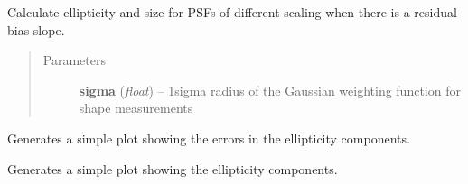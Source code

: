 \documentclass[a4paper,12pt,english]{sphinxmanual}
\begin{document}

\begin{fulllineitems}
\label{reduction:analysis.biasCalibration.findTolerableErrorSlope}
Calculate ellipticity and size for PSFs of different scaling when there is a residual
bias slope.
\begin{quote}\begin{description}
\item[{Parameters}] \leavevmode
\textbf{sigma} (\emph{float}) -- 1sigma radius of the Gaussian weighting function for shape measurements

\end{description}\end{quote}

\end{fulllineitems}


\begin{fulllineitems}
\label{reduction:analysis.biasCalibration.plotDeltaEs}
Generates a simple plot showing the errors in the ellipticity components.

\end{fulllineitems}


\begin{fulllineitems}
\label{reduction:analysis.biasCalibration.plotEs}
Generates a simple plot showing the ellipticity components.

\end{fulllineitems}

\end{document}
